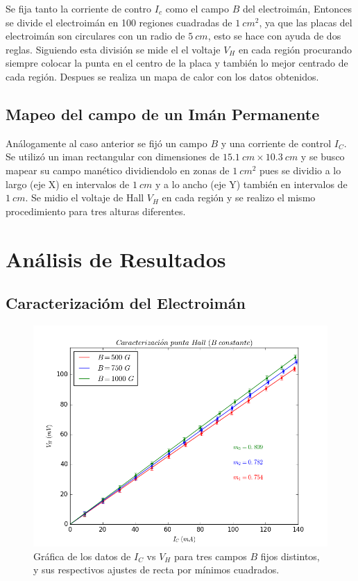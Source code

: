 \documentclass[twocolumn,showpacs,preprintnumbers,amsmath,amssymb]{revtex4-1}
\begin{document}
Se fija tanto la corriente de contro $I_c$ como el campo $B$ del electroimán, Entonces
se divide el electroimán en 100 regiones cuadradas de $1\ cm^2$, ya que las placas del electroimán son circulares con un radio
de $5\ cm$, esto se hace con ayuda de dos reglas. Siguiendo esta división se mide el el voltaje $V_H$ en cada región procurando
siempre colocar la punta en el centro de la placa y también lo mejor centrado de cada región. Despues se realiza un mapa de calor
con los datos obtenidos.

\subsection{Mapeo del campo de un Imán Permanente}

Análogamente al caso anterior se fijó un campo $B$ y una corriente de control $I_C$. Se utilizó un iman rectangular con
dimensiones de $15.1\ cm \times 10.3\ cm$ y se busco mapear su campo manético dividiendolo en zonas de
$1\ cm^2$ pues se dividio a lo largo (eje X) en intervalos de $1\ cm$ y a lo ancho (eje Y) también en intervalos de $1\ cm$. Se
midio el voltaje de Hall $V_H$ en cada región y se realizo el mismo procedimiento para tres alturas diferentes.


\section{Análisis de Resultados}

\subsection{Caracterizacióm del Electroimán}

\begin{figure}
\includegraphics[scale=0.46]{figura_5.png}
\caption{\label{fig:epsart}Gráfica de los datos de $I_C$ vs $V_H$ para tres campos $B$ fijos distintos, y sus respectivos ajustes de recta
por mínimos cuadrados.}
\end{figure}
\end{document}

